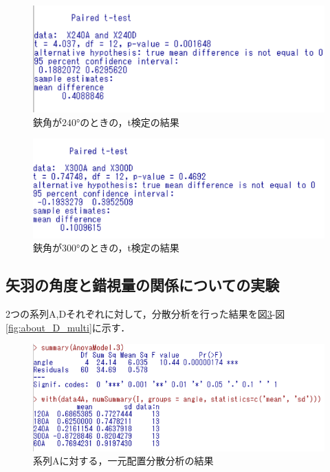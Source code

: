 \documentclass{jlreq}
\numberwithin{equation}{section}
\begin{document}
\begin{figure}[H]
  \centering
  \includegraphics{image/240degree.png}
  \caption{鋏角が$240\si{\degree}$のときの，t検定の結果}
  \label{fig:240degree}
\end{figure}

\begin{figure}[H]
  \centering
  \includegraphics{image/300degree.png}
  \caption{鋏角が$300\si{\degree}$のときの，t検定の結果}
  \label{fig:300degree}
\end{figure}

\subsection{矢羽の角度と錯視量の関係についての実験}
2つの系列A,Dそれぞれに対して，分散分析を行った結果を図\ref{fig:about_A_oneway}-図\ref{fig:about_D_multi}に示す．

\begin{figure}[H]
  \centering
  \includegraphics{image/about_A(一元).png}
  \caption{系列Aに対する，一元配置分散分析の結果}
  \label{fig:about_A_oneway}
\end{figure}
\end{document}
